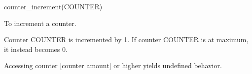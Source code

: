 

\format
counter\_increment(COUNTER)

\purpose

To increment a counter.

\description

Counter COUNTER is incremented by 1.
If counter COUNTER is at maximum, it instead becomes 0.

\notes

Accessing counter [counter amount] or higher yields undefined behavior.
